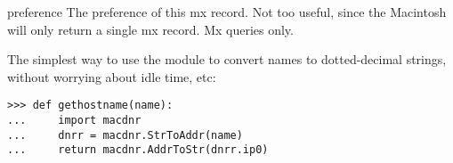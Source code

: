 \begin{datadesc}{preference}
The preference of this mx record. Not too useful, since the Macintosh
will only return a single mx record. Mx queries only.
\end{datadesc}

The simplest way to use the module to convert names to dotted-decimal
strings, without worrying about idle time, etc:
\begin{verbatim}
>>> def gethostname(name):
...     import macdnr
...     dnrr = macdnr.StrToAddr(name)
...     return macdnr.AddrToStr(dnrr.ip0)
\end{verbatim}
